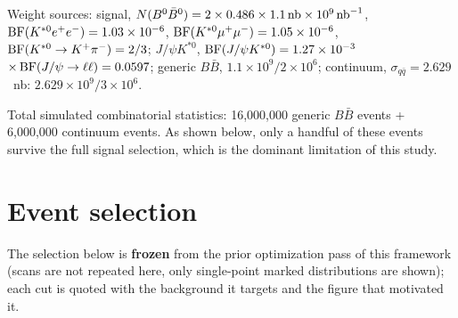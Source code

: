 \documentclass[11pt]{article}
\begin{document}
Weight sources: signal, $N(B^0\bar B^0)=2\times0.486\times1.1\,{\rm nb}\times10^9\,{\rm nb}^{-1}$,
${\rm BF}(K^{*0}e^+e^-)=1.03\times10^{-6}$, ${\rm BF}(K^{*0}\mu^+\mu^-)=1.05\times10^{-6}$,
${\rm BF}(K^{*0}\to K^+\pi^-)=2/3$; $J/\psi K^{*0}$, ${\rm BF}(J/\psi K^{*0})=1.27\times10^{-3}$
$\times\,{\rm BF}(J/\psi\to\ell\ell)=0.0597$; generic $B\bar B$, $1.1\times10^9/2\times10^6$;
continuum, $\sigma_{q\bar q}=2.629$~nb: $2.629\times10^9/3\times10^6$.

Total simulated combinatorial statistics: 16,000,000 generic $B\bar B$
events + 6,000,000 continuum events. As shown below, only a handful of
these events survive the full signal selection, which is the dominant
limitation of this study.

\section{Event selection}
\label{sec:selection}

The selection below is \textbf{frozen} from the prior optimization pass
of this framework (scans are not repeated here, only single-point
marked distributions are shown); each cut is quoted with the background
it targets and the figure that motivated it.
\end{document}

